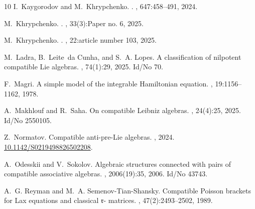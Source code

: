 \documentclass{jonasart}
\begin{document}
{\begin{thebibliography}{10}
        I.~Kaygorodov and M.~Khrypchenko.
        .
        , 647:458--491, 2024.
        
        M.~Khrypchenko.
        .
        , 33(3):Paper no. 6, 2025.
        
        M.~Khrypchenko.
        .
        , 22:article number 103, 2025.
        
        M.~Ladra, B.~Leite~da Cunha, and S.~A. Lopes.
        \newblock A classification of nilpotent compatible {Lie} algebras.
        , 74(1):29, 2025.
        \newblock Id/No 70.
        
        F.~Magri.
        \newblock A simple model of the integrable {Hamiltonian} equation.
        , 19:1156--1162, 1978.
        
        A.~Makhlouf and R.~Saha.
        \newblock On compatible {Leibniz} algebras.
        , 24(4):25, 2025.
        \newblock Id/No 2550105.
        
        Z.~Normatov.
        \newblock Compatible anti-pre-{L}ie algebras.
        , 2024.
        \newblock
        \href{https://www.worldscientific.com/doi/10.1142/S0219498826502208}{10.1142/S0219498826502208}.
        
        A.~Odesskii and V.~Sokolov.
        \newblock Algebraic structures connected with pairs of compatible associative
        algebras.
        , 2006(19):35, 2006.
        \newblock Id/No 43743.
        
        A.~G. Reyman and M.~A. Semenov-Tian-Shansky.
        \newblock Compatible {Poisson} brackets for {Lax} equations and classical
        {{\({\mathfrak r}\)}}- matrices.
        , 47(2):2493--2502, 1989.
        

\end{thebibliography}}
\end{document}
